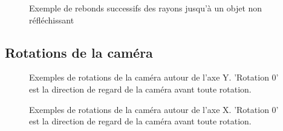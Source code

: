 \documentclass[11pt]{article}
\begin{document}
\begin{appendices}
\begin{figure}[h!]
				\caption{Exemple de rebonds successifs des rayons jusqu'à un objet non réfléchissant}
				\label{reflectionsSchema}
			\end{figure}
			\FloatBarrier
			\label{annexe:reflexionsRecursives}
			
			\subsection{Rotations de la caméra}
			\begin{figure}[h!]
				
				\caption {Exemples de rotations de la caméra autour de l'axe Y. 'Rotation 0' est la direction de regard de la caméra avant toute rotation.}
			\end{figure}
			\FloatBarrier
			
			\begin{figure}[h!]
				
				\caption {Exemples de rotations de la caméra autour de l'axe X. 'Rotation 0' est la direction de regard de la caméra avant toute rotation.}
			\end{figure}
			\FloatBarrier
			\label{annexe:rotationsCamera}
	\FloatBarrier
	\end{appendices}
\end{document}
